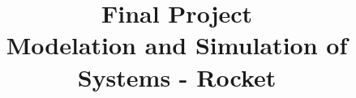 \documentclass[article, 11pt]{IEEEtran}   %
\begin{document}
\title{Final Project\\ Modelation and Simulation of Systems - Rocket}


\author{
}


\maketitle




\begin{abstract}
\lipsum[1-1]
\end{abstract}



\end{document}
